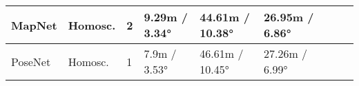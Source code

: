 \documentclass[10pt,twocolumn,letterpaper]{article}
\begin{document}
\begin{table*}[!t]
\begin{tabular}{|l|l|l|l|l|l|l|l|l|}
MapNet               & Homosc.            & 2               & 9.29m / 3.34°                         & 44.61m / 10.38°                       & 26.95m / 6.86°                         &                               &                               &                                       \\ \hline
PoseNet              & Homosc.            & 1               & 7.9m / 3.53°                          & 46.61m / 10.45°                       & 27.26m / 6.99°                         &                               &                               &                                       \\ \hline
\end{tabular}

\vspace{1mm}
\end{table*} 
\end{document}
